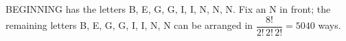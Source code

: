 BEGINNING has the letters B, E, G, G, I, I, N, N, N. Fix an N in front; the remaining letters B, E, G, G, I, I, N, N can be arranged in $\dfrac{8!}{2!\,2!\,2!}=\boxed{5040}$ ways.
